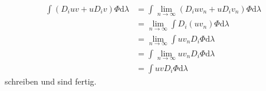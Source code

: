 \begin{solution}
\begin{align*}
    \int (D_iuv+uD_iv)\Phi\mathrm{d}\lambda&=\int \lim_{n\to\infty}(D_iuv_n+uD_iv_n)\Phi\mathrm{d}\lambda\\
    &=\lim_{n\to\infty}\int D_i(uv_n)\Phi\mathrm{d}\lambda\\
    &=\lim_{n\to\infty}\int uv_nD_i\Phi\mathrm{d}\lambda\\
    &=\int\lim_{n\to\infty}uv_nD_i\Phi\mathrm{d}\lambda\\
    &=\int uvD_i\Phi\mathrm{d}\lambda
\end{align*} 
schreiben und sind fertig.
\end{solution}
